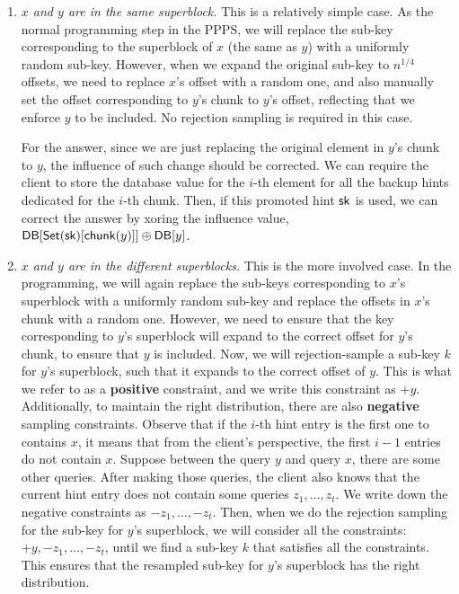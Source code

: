 \begin{enumerate}
    \item \textit{$x$ and $y$ are in the same superblock.} This is a relatively
    simple case. As the normal programming step in the PPPS, we will replace the sub-key corresponding to the
    superblock of $x$ (the same as $y$) with a uniformly random sub-key. However,
    when we expand the original sub-key to $n^{1/4}$ offsets, we need to replace
    $x$'s offset with a random one, and also manually set the offset
    corresponding to $y$'s chunk to $y$'s offset, reflecting that we enforce $y$
    to be included. No rejection sampling is required in this case.
    
    For the answer, since we are just replacing the original element in $y$'s chunk to
    $y$, the influence of such change should be corrected. We can require the
    client to store the database value for the $i$-th element for all the backup
    hints dedicated for the $i$-th chunk. Then, if this promoted hint $\mathsf{sk}$ is
    used, we can correct the answer by xoring the influence value,
    $\mathsf{DB}[\mathsf{Set}(\mathsf{sk})[\mathsf{chunk}(y)]]\oplus\mathsf{DB}[y]$.
    
    \item \textit{$x$ and $y$ are in the different superblocks.} This is the
    more involved case. In the programming, we will again replace the sub-keys corresponding to
    $x$'s superblock with a uniformly random sub-key and replace the offsets in
    $x$'s chunk with a random one. However, we need to ensure that the key
    corresponding to $y$'s superblock will expand to the correct offset for
    $y$'s chunk, to ensure that $y$ is included. Now, we will rejection-sample a
    sub-key $k$ for $y$'s superblock, such that it expands to the correct offset
    of $y$. This is what we refer to as a \textbf{positive} constraint, and we
    write this constraint as $+y$.
    Additionally, to maintain the right distribution, there are also
    \textbf{negative} sampling constraints. Observe that if the $i$-th hint
    entry is the first one to contains $x$, it means that from the client's
    perspective, the first $i-1$ entries do not contain $x$. Suppose between
    the query $y$ and query $x$, there are some other queries. After making
    those queries, the client also knows that the current hint entry does not contain
    some queries $z_1,\dots,z_t$. We write down the negative
    constraints as $-z_1,\dots,-z_t$. Then, when we do the rejection sampling
    for the sub-key for $y$'s superblock, we will consider all the constraints:
    $+y, -z_1,\dots,-z_t$, until we find a sub-key $k$ that satisfies all the
    constraints. This ensures that the resampled sub-key for $y$'s superblock has the
    right distribution.
    

\end{enumerate}
